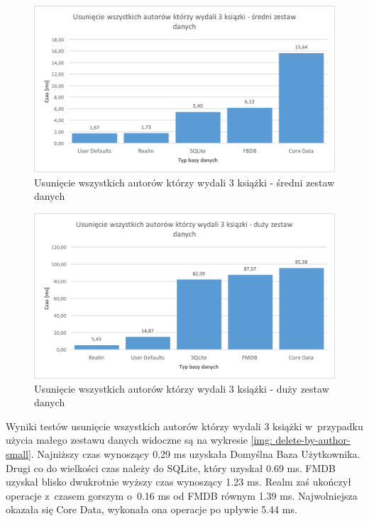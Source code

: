 \begin{figure}[H]
    \centering\includegraphics[width=\linewidth]{img/delete_data/delete_by_author/delete_by_author_medium_test.png}
    \caption{Usunięcie wszystkich autorów którzy wydali 3 książki - średni zestaw danych}
    \label{img: delete-by-author-medium}
\end{figure}

\begin{figure}[H]
    \centering\includegraphics[width=\linewidth]{img/delete_data/delete_by_author/delete_by_author_big_test.png}
    \caption{Usunięcie wszystkich autorów którzy wydali 3 książki - duży zestaw danych}
    \label{img: delete-by-author-big}
\end{figure}

Wyniki testów usunięcie wszystkich autorów którzy wydali 3 książki w~przypadku użycia małego zestawu danych widoczne są na wykresie \ref{img: delete-by-author-small}.  Najniższy czas wynoszący 0.29 ms uzyskała Domyślna Baza Użytkownika. Drugi co do wielkości czas należy do SQLite, który uzyskał 0.69 ms. FMDB uzyskał blisko dwukrotnie wyższy czas wynoszący 1.23 ms. Realm zaś ukończył operacje z~czasem gorszym o~0.16 ms od FMDB równym 1.39 ms. Najwolniejsza okazała się Core Data, wykonała ona operacje po upływie 5.44 ms. 

